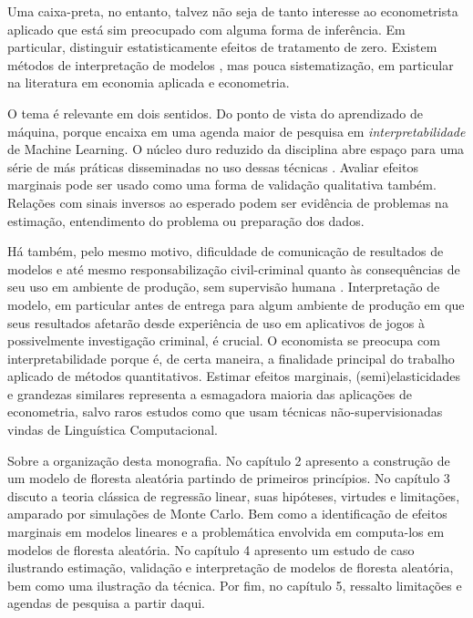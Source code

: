Uma caixa-preta, no entanto, talvez não seja de tanto interesse ao econometrista aplicado que está sim preocupado com alguma forma de inferência. Em particular, distinguir estatisticamente efeitos de tratamento de zero. Existem métodos de interpretação de modelos \cite{ribeiro2016model}, mas pouca sistematização, em particular na literatura em economia aplicada e econometria. 

O tema é relevante em dois sentidos. Do ponto de vista do aprendizado de máquina, porque encaixa em uma agenda maior de pesquisa em \textit{interpretabilidade} de Machine Learning. O núcleo duro reduzido da disciplina abre espaço para uma série de más práticas disseminadas no uso dessas técnicas \cite{flach2019performance}. Avaliar efeitos marginais pode ser usado como uma forma de validação qualitativa também. Relações com sinais inversos ao esperado podem ser evidência de problemas na estimação, entendimento do problema ou preparação dos dados.

Há também, pelo mesmo motivo, dificuldade de comunicação de resultados de modelos e até mesmo responsabilização civil-criminal quanto às consequências de seu uso em ambiente de produção, sem supervisão humana \cite{lepri2018fair}. Interpretação de modelo, em particular antes de entrega para algum ambiente de produção em que seus resultados afetarão desde experiência de uso em aplicativos de jogos à possivelmente investigação criminal, é crucial. O economista se preocupa com interpretabilidade porque é, de certa maneira, a finalidade principal do trabalho aplicado de métodos quantitativos. Estimar efeitos marginais, (semi)elasticidades e grandezas similares representa a esmagadora maioria das aplicações de econometria, salvo raros estudos como  que usam técnicas não-supervisionadas vindas de Linguística Computacional.

Sobre a organização desta monografia. No capítulo 2 apresento a construção de um modelo de floresta aleatória partindo de primeiros princípios. No capítulo 3 discuto a teoria clássica de regressão linear, suas hipóteses, virtudes e limitações, amparado por simulações de Monte Carlo. Bem como a identificação de efeitos marginais em modelos lineares e a problemática envolvida em computa-los em modelos de floresta aleatória. No capítulo 4 apresento um estudo de caso ilustrando estimação, validação e interpretação de modelos de floresta aleatória, bem como uma ilustração da técnica. Por fim, no capítulo 5, ressalto limitações e agendas de pesquisa a partir daqui.


